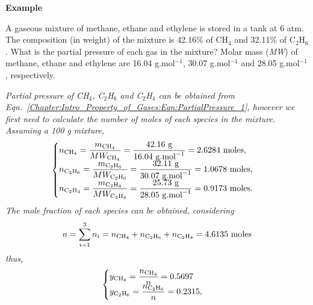 \medskip
   \begin{MyExample}{\begin{center}{\bf Example}\end{center}}
     \begin{example}\label{Chapter:Intro_Property_of_Gases:Example4}
       A gaseous mixture of methane, ethane and ethylene is stored in a tank at 6 atm. The composition (in weight) of the mixture is 42.16$\%$ of CH$_{4}$ and 32.11$\%$ of C$_{2}$H$_{6}$. What is the partial pressure of each gas in the mixture? Molar mass ({\it MW}) of methane, ethane and ethylene are 16.04 g.mol$^{-1}$, 30.07 g.mol$^{-1}$ and 28.05 g.mol$^{-1}$, respectively.
\medskip

       {\it Partial pressure of CH$_{4}$, C$_{2}$H$_{6}$ and C$_{2}$H$_{4}$ can be obtained from Eqn.~\ref{Chapter:Intro_Property_of_Gases:Eqn:PartialPressure_1}, however we first need to calculate the number of moles of each species in the mixture. Assuming a 100 g mixture,}
       \begin{displaymath}
         \begin{cases}
           n_{\text{CH}_{4}} = \frc{m_{\text{CH}_{4}}}{MW_{\text{CH}_{4}}} = \frc{42.16\text{ g}}{16.04\text{ g.mol}^{-1}}= 2.6284\text{ moles},  \\
           n_{\text{C}_{2}\text{H}_{6}} = \frc{m_{\text{C}_{2}\text{H}_{6}}}{MW_{\text{C}_{2}\text{H}_{6}}} = \frc{32.11\text{ g}}{30.07\text{ g.mol}^{-1}}= 1.0678\text{ moles},  \\
           n_{\text{C}_{2}\text{H}_{4}} = \frc{m_{\text{C}_{2}\text{H}_{4}}}{MW_{\text{C}_{2}\text{H}_{4}}} = \frc{25.73\text{ g}}{28.05\text{ g.mol}^{-1}}= 0.9173\text{ moles}. 
         \end{cases}
       \end{displaymath}
       {\it The mole fraction of each species can be obtained, considering}
       \begin{displaymath}
         n = \summation[n_{i}]{i=1}{3} = n_{\text{CH}_{4}}+n_{\text{C}_{2}\text{H}_{6}}+n_{\text{C}_{2}\text{H}_{4}} = 4.6135\text{ moles}
       \end{displaymath}
       {\it thus,}
       \begin{displaymath}
         \begin{cases}
           y_{\text{CH}_{4}} = \frc{n_{\text{CH}_{4}}}{n} = 0.5697  \\
           y_{\text{C}_{2}\text{H}_{6}} = \frc{n_{\text{C}_{2}\text{H}_{6}}}{n} = 0.2315,  \\

\end{cases}
\end{displaymath}
\end{example}
\end{MyExample}

